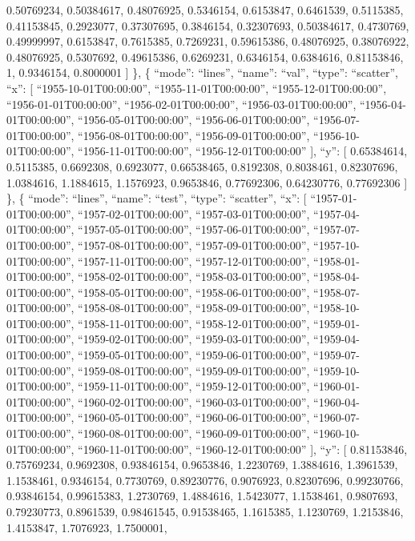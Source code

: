 \documentclass[
]{article}
\begin{document}
0.50769234, 0.50384617, 0.48076925, 0.5346154, 0.6153847, 0.6461539,
0.5115385, 0.41153845, 0.2923077, 0.37307695, 0.3846154, 0.32307693,
0.50384617, 0.4730769, 0.49999997, 0.6153847, 0.7615385, 0.7269231,
0.59615386, 0.48076925, 0.38076922, 0.48076925, 0.5307692, 0.49615386,
0.6269231, 0.6346154, 0.6384616, 0.81153846, 1, 0.9346154, 0.8000001 {]}
\}, \{ ``mode'': ``lines'', ``name'': ``val'', ``type'': ``scatter'',
``x'': {[} ``1955-10-01T00:00:00'', ``1955-11-01T00:00:00'',
``1955-12-01T00:00:00'', ``1956-01-01T00:00:00'',
``1956-02-01T00:00:00'', ``1956-03-01T00:00:00'',
``1956-04-01T00:00:00'', ``1956-05-01T00:00:00'',
``1956-06-01T00:00:00'', ``1956-07-01T00:00:00'',
``1956-08-01T00:00:00'', ``1956-09-01T00:00:00'',
``1956-10-01T00:00:00'', ``1956-11-01T00:00:00'',
``1956-12-01T00:00:00'' {]}, ``y'': {[} 0.65384614, 0.5115385,
0.6692308, 0.6923077, 0.66538465, 0.8192308, 0.8038461, 0.82307696,
1.0384616, 1.1884615, 1.1576923, 0.9653846, 0.77692306, 0.64230776,
0.77692306 {]} \}, \{ ``mode'': ``lines'', ``name'': ``test'', ``type'':
``scatter'', ``x'': {[} ``1957-01-01T00:00:00'',
``1957-02-01T00:00:00'', ``1957-03-01T00:00:00'',
``1957-04-01T00:00:00'', ``1957-05-01T00:00:00'',
``1957-06-01T00:00:00'', ``1957-07-01T00:00:00'',
``1957-08-01T00:00:00'', ``1957-09-01T00:00:00'',
``1957-10-01T00:00:00'', ``1957-11-01T00:00:00'',
``1957-12-01T00:00:00'', ``1958-01-01T00:00:00'',
``1958-02-01T00:00:00'', ``1958-03-01T00:00:00'',
``1958-04-01T00:00:00'', ``1958-05-01T00:00:00'',
``1958-06-01T00:00:00'', ``1958-07-01T00:00:00'',
``1958-08-01T00:00:00'', ``1958-09-01T00:00:00'',
``1958-10-01T00:00:00'', ``1958-11-01T00:00:00'',
``1958-12-01T00:00:00'', ``1959-01-01T00:00:00'',
``1959-02-01T00:00:00'', ``1959-03-01T00:00:00'',
``1959-04-01T00:00:00'', ``1959-05-01T00:00:00'',
``1959-06-01T00:00:00'', ``1959-07-01T00:00:00'',
``1959-08-01T00:00:00'', ``1959-09-01T00:00:00'',
``1959-10-01T00:00:00'', ``1959-11-01T00:00:00'',
``1959-12-01T00:00:00'', ``1960-01-01T00:00:00'',
``1960-02-01T00:00:00'', ``1960-03-01T00:00:00'',
``1960-04-01T00:00:00'', ``1960-05-01T00:00:00'',
``1960-06-01T00:00:00'', ``1960-07-01T00:00:00'',
``1960-08-01T00:00:00'', ``1960-09-01T00:00:00'',
``1960-10-01T00:00:00'', ``1960-11-01T00:00:00'',
``1960-12-01T00:00:00'' {]}, ``y'': {[} 0.81153846, 0.75769234,
0.9692308, 0.93846154, 0.9653846, 1.2230769, 1.3884616, 1.3961539,
1.1538461, 0.9346154, 0.7730769, 0.89230776, 0.9076923, 0.82307696,
0.99230766, 0.93846154, 0.99615383, 1.2730769, 1.4884616, 1.5423077,
1.1538461, 0.9807693, 0.79230773, 0.8961539, 0.98461545, 0.91538465,
1.1615385, 1.1230769, 1.2153846, 1.4153847, 1.7076923, 1.7500001,
\end{document}
